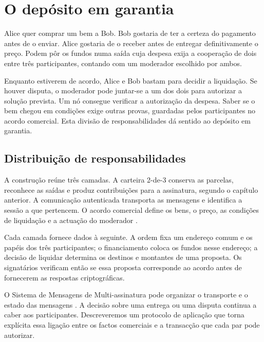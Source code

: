 \chapter{O depósito em garantia}
\label{chapter:escrowed-market}

Alice quer comprar um bem a Bob. Bob gostaria de ter a certeza do
pagamento antes de o enviar. Alice gostaria de o receber antes de
entregar definitivamente o preço. Podem pôr os fundos numa saída
cuja despesa exija a cooperação de dois entre três participantes,
contando com um moderador escolhido por ambos.

Enquanto estiverem de acordo, Alice e Bob bastam para decidir a
liquidação. Se houver disputa, o moderador pode juntar-se a um dos
dois para autorizar a solução prevista. Um nó consegue verificar a
autorização da despesa. Saber se o bem chegou em condições exige
outras provas, guardadas pelos participantes no acordo comercial.
Esta divisão de responsabilidades dá sentido ao depósito em garantia.

\section{Distribuição de responsabilidades}
\label{sec:escrow-implementation-status}

A construção reúne três camadas. A carteira 2-de-3 conserva as parcelas,
reconhece as saídas e produz contribuições para a assinatura, segundo o
capítulo anterior. A comunicação autenticada transporta as mensagens e
identifica a sessão a que pertencem. O acordo comercial define os bens, o
preço, as condições de liquidação e a actuação do moderador
\cite{openbazaar-rbrunner-investigation,monero-source-v16}.

Cada camada fornece dados à seguinte. A ordem fixa um endereço comum e os
papéis dos três participantes; o financiamento coloca os fundos nesse
endereço; a decisão de liquidar determina os destinos e montantes de uma
proposta. Os signatários verificam então se essa proposta corresponde ao
acordo antes de fornecerem as respostas criptográficas.

O Sistema de Mensagens de Multi-assinatura pode organizar o transporte e o
estado das mensagens \cite{mms-manual,mms-project-proposal}. A decisão sobre
uma entrega ou uma disputa continua a caber aos participantes. Descreveremos
um protocolo de aplicação que torna explícita essa ligação entre os factos
comerciais e a transacção que cada par pode autorizar.

